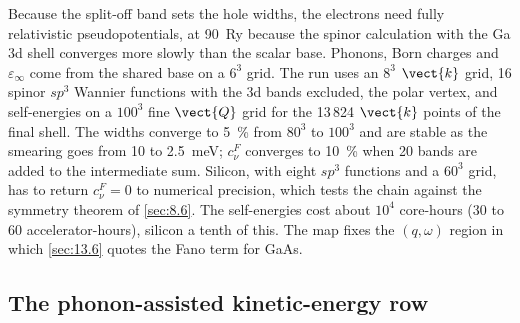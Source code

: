 Because the split-off band sets the hole widths, the electrons need fully relativistic pseudopotentials, at \SI{90}{Ry} because the spinor calculation with the Ga 3d shell converges more slowly than the scalar base. Phonons, Born charges and $\varepsilon_\infty$ come from the shared base on a $6^3$ grid. The run uses an $8^3$ $\vect{k}$ grid, 16 spinor $sp^3$ Wannier functions with the 3d bands excluded, the polar vertex, and self-energies on a $100^3$ fine $\vect{Q}$ grid for the 13\,824 $\vect{k}$ points of the final shell. The widths converge to \SI{5}{\percent} from $80^3$ to $100^3$ and are stable as the smearing goes from 10 to \SI{2.5}{meV}; $c^F_\nu$ converges to \SI{10}{\percent} when 20 bands are added to the intermediate sum. Silicon, with eight $sp^3$ functions and a $60^3$ grid, has to return $c^F_\nu = 0$ to numerical precision, which tests the chain against the symmetry theorem of \cref{sec:8.6}. The self-energies cost about $10^4$ core-hours (30 to 60 accelerator-hours), silicon a tenth of this. The map fixes the $(q,\omega)$ region in which \cref{sec:13.6} quotes the Fano term for GaAs.

\subsection{The phonon-assisted kinetic-energy row}

